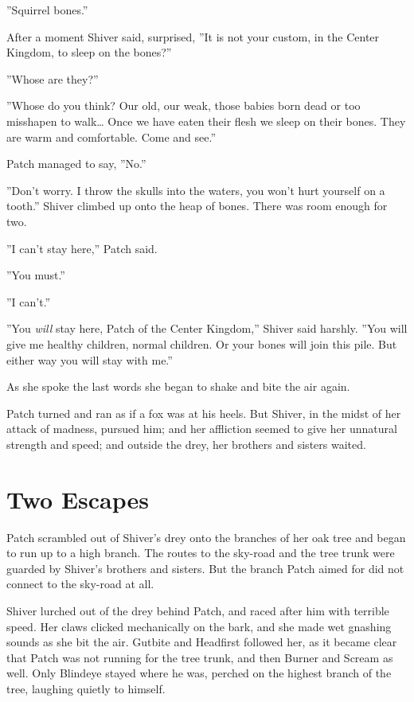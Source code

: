 \documentclass[12pt]{book}
\begin{document}
''Squirrel bones.''

After a moment Shiver said, surprised, ''It is not your custom, in the Center Kingdom, to sleep on the bones?''

''Whose are they?''

''Whose do you think? Our old, our weak, those babies born dead or too misshapen to walk\ldots{}
Once we have eaten their flesh we sleep on their bones. They are warm and comfortable. Come and see.''

Patch managed to say, ''No.''

''Don't worry. I throw the skulls into the waters, you won't hurt yourself on a tooth.'' Shiver climbed up onto the heap of bones. There was room enough for two.

''I can't stay here,'' Patch said.

''You must.''

''I can't.''

''You {\it will} stay here, Patch of the Center Kingdom,'' Shiver said harshly. ''You will give me healthy children, normal children. Or your bones will join this pile. But either way you will stay with me.''

As she spoke the last words she began to shake and bite the air again.

Patch turned and ran as if a fox was at his heels. But Shiver, in the midst of her attack of madness, pursued him; and her affliction seemed to give her unnatural strength and speed; and outside the drey, her brothers and sisters waited.


\section{Two Escapes}

Patch scrambled out of Shiver's drey onto the branches of her oak tree and began to run up to a high branch. The routes to the sky-road and the tree trunk were guarded by Shiver's brothers and sisters. But the branch Patch aimed for did not connect to the sky-road at all.

Shiver lurched out of the drey behind Patch, and raced after him with terrible speed. Her claws clicked mechanically on the bark, and she made wet gnashing sounds as she bit the air. Gutbite and Headfirst followed her, as it became clear that Patch was not running for the tree trunk, and then Burner and Scream as well. Only Blindeye stayed where he was, perched on the highest branch of the tree, laughing quietly to himself.
\end{document}
